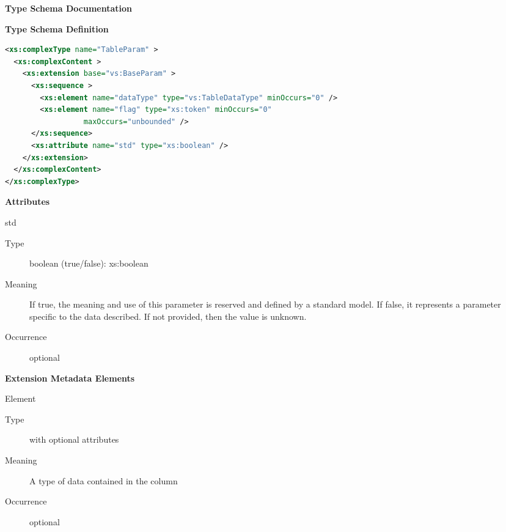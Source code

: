 \documentclass[11pt,a4paper]{ivoa}
\begin{document}
\begin{generated}
\begingroup
        \renewcommand*\descriptionlabel[1]{%
        \hbox to 5.5em{\emph{#1}\hfil}}\vspace{2ex}\noindent\textbf{ Type Schema Documentation}


\vspace{1ex}\noindent\textbf{ Type Schema Definition}

\begin{lstlisting}[language=XML,basicstyle=\footnotesize]
<xs:complexType name="TableParam" >
  <xs:complexContent >
    <xs:extension base="vs:BaseParam" >
      <xs:sequence >
        <xs:element name="dataType" type="vs:TableDataType" minOccurs="0" />
        <xs:element name="flag" type="xs:token" minOccurs="0"
                  maxOccurs="unbounded" />
      </xs:sequence>
      <xs:attribute name="std" type="xs:boolean" />
    </xs:extension>
  </xs:complexContent>
</xs:complexType>
\end{lstlisting}

\vspace{0.5ex}\noindent\textbf{ Attributes}

\begingroup\small\begin{bigdescription}
\item[std]
\begin{description}
\item[Type] boolean (true/false): xs:boolean
\item[Meaning] If true, the meaning and use of this parameter is
                     reserved and defined by a standard model.  If false,
                     it represents a parameter specific to the data described.
                     If not provided, then the value is unknown.
\item[Occurrence] optional
\end{description}


\end{bigdescription}\endgroup



\vspace{0.5ex}\noindent\textbf{ Extension Metadata Elements}

\begingroup\small\begin{bigdescription}\item[Element \xmlel{dataType}]
\begin{description}
\item[Type]  with optional attributes
\item[Meaning] A type of data contained in the column
\item[Occurrence] optional


\end{description}
\end{bigdescription}
\end{generated}
\end{document}
